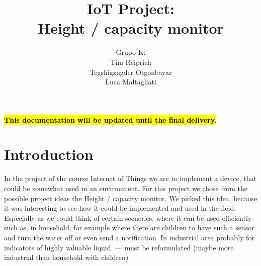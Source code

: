 \documentclass{article}
\title{IoT Project: \\Height / capacity monitor}
\author{Grupo K: \\ Tim Reiprich \\ Tegshigzugder Otgonbayar \\ Luca Maltagliati}
\begin{document}
\pagestyle{plain}

\maketitle


\newpage

\textcolor{red}{\textbf{\hl{This documentation will be updated until the final delivery.}}}

\tableofcontents %
\newpage




\section{Introduction}

In the project of the course Internet of Things we are to implement a device, that could be somewhat used in an environment. For this project we chose from the possible project ideas the Height / capacity monitor. We picked this idea, because it was interesting to see how it could be implemented and used in the field. Especially as we could think of certain sceneries, where it can be used efficiently such as, in household, for example where there are children to have such a sensor and turn the water off or even send a notification. In industrial area probably for indicators of highly valuable liquid. --- must be reformulated (maybe more industrial than household with children)
\end{document}
